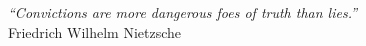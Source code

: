 \cleardoublepage
\thispagestyle{plain}

\vspace*{8cm}

\begin{flushright}
   \textsl{``Convictions are more dangerous foes of truth than lies.''} \\
\vspace*{1.5cm}
           Friedrich Wilhelm Nietzsche
\end{flushright}
